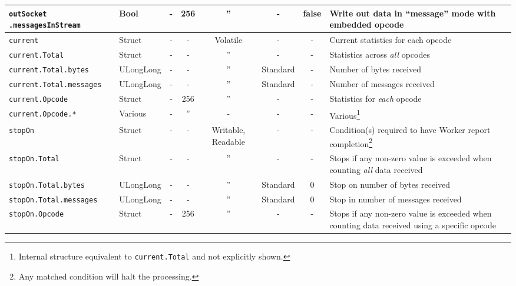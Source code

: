 \begin{landscape}
\begin{minipage}{\textwidth}
\begin{scriptsize}
\begin{tabular}{|p{3.2cm}|p{1.5cm}|c|c|c|c|c|p{7cm}|}
      \hline
      \verb+outSocket+ \verb+.messagesInStream+ &
      Bool &
      - &
      256 &
      '' &
      - &
      false &
      Write out data in ``message'' mode with embedded opcode \\
      \hline
      \verb+current+ &
      Struct &
      - &
      - &
      Volatile &
      - &
      - &
      Current statistics for each opcode \\
      \hline
      \verb+current.Total+ &
      Struct &
      - &
      - &
      '' &
      - &
      - &
      Statistics across \textit{all} opcodes \\
      \hline
      \verb+current.Total.bytes+ &
      ULongLong &
      - &
      - &
      '' &
      Standard &
      - &
      Number of bytes received \\
      \hline
      \verb+current.Total.messages+ &
      ULongLong &
      - &
      - &
      '' &
      Standard &
      - &
      Number of messages received \\
      \hline
      \verb+current.Opcode+ &
      Struct &
      - &
      256 &
      '' &
      - &
      - &
      Statistics for \textit{each} opcode \\
      \hline
      \verb+current.Opcode.*+ &
      Various &
      - &
      '' &
      - &
      - &
      - &
      Various\footnote{Internal structure equivalent to \texttt{current.Total} and not explicitly shown.} \\
      \hline
      \verb+stopOn+ &
      Struct &
      - &
      - &
      Writable, Readable\footnotemark[\thefnreadable] &
      - &
      - &
      Condition(s) required to have Worker report completion\footnote{Any matched condition will halt the processing.} \\
      \hline
      \verb+stopOn.Total+ &
      Struct &
      - &
      - &
      '' &
      - &
      - &
      Stops if any non-zero value is exceeded when counting \textit{all} data received \\
      \hline
      \verb+stopOn.Total.bytes+ &
      ULongLong &
      - &
      - &
      '' &
      Standard &
      0 &
      Stop on number of bytes received \\
      \hline
      \verb+stopOn.Total.messages+ &
      ULongLong &
      - &
      - &
      '' &
      Standard &
      0 &
      Stop in number of messages received \\
      \hline
      \verb+stopOn.Opcode+ &
      Struct &
      - &
      256 &
      '' &
      - &
      - &
      Stops if any non-zero value is exceeded when counting data received using a specific opcode \\

\end{tabular}
\end{scriptsize}
\end{minipage}
\end{landscape}
